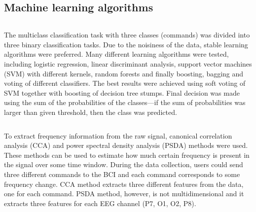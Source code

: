 \documentclass[final]{beamer}
\begin{document}
\begin{poster}
\vspace{0.5cm}

\section{Machine learning algorithms}

\begin{columns}[T]
\vspace{1.7cm}
\justify
The multiclass classification task with three classes (commands) was divided into three binary classification tasks. Due to the noisiness of the data, stable learning algorithms were preferred. Many different learning algorithms were tested, including logistic regression, linear discriminant analysis, support vector machines (SVM) with different kernels, random forests and finally boosting, bagging and voting of different classifiers. The best results were achieved using soft voting of SVM together with boosting of decision tree stumps. Final decision was made using the sum of the probabilities of the classes---if the sum of probabilities was larger than given threshold, then the class was predicted. 

\end{columns}

\newcolumn

\vspace{0.1cm}
\justify
To extract frequency information from the raw signal, canonical correlation analysis (CCA) and power spectral density analysis (PSDA) methods were used. These methods can be used to estimate how much certain frequency is present in the signal over some time window. During the data collection, users could send three different commands to the BCI and each command corresponds to some frequency change. CCA method extracts three different features from the data, one for each command. PSDA method, however, is not multidimensional and it extracts three features for each EEG channel (P7, O1, O2, P8).

\vspace{43.5cm}

\end{poster}
\end{document}
